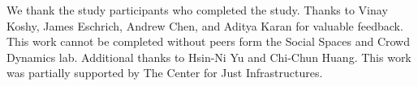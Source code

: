 \begin{acks}
We thank the study participants who completed the study. Thanks to Vinay Koshy, James Eschrich, Andrew Chen, and Aditya Karan for valuable feedback. This work cannot be completed without peers form the Social Spaces and Crowd Dynamics lab. Additional thanks to Hsin-Ni Yu and Chi-Chun Huang. This work was partially supported by The Center for Just Infrastructures.
\end{acks}

